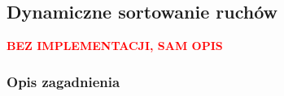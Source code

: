 \subsection{Dynamiczne sortowanie ruchów}
\label{subsec:dynamiczne-sortowanie}
\begin{center}
    \textcolor{red}{\textbf{BEZ IMPLEMENTACJI, SAM OPIS}}
\end{center}


\subsubsection{Opis zagadnienia}